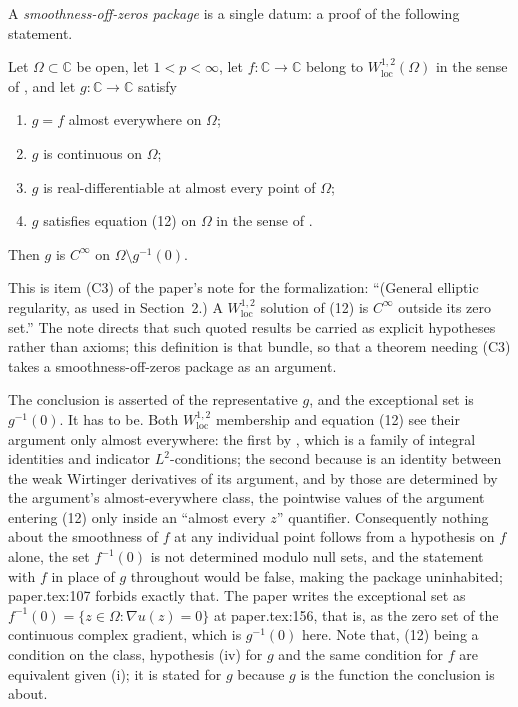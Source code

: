 \begin{definition}
A \emph{smoothness-off-zeros package} is a single datum: a proof of the
following statement.

Let $\Omega\subset\mathbb{C}$ be open, let $1<p<\infty$, let
$f\colon\mathbb{C}\to\mathbb{C}$ belong to $W^{1,2}_{\mathrm{loc}}(\Omega)$ in
the sense of , and let $g\colon\mathbb{C}\to\mathbb{C}$
satisfy
\begin{enumerate}
\item[(i)] $g=f$ almost everywhere on $\Omega$;
\item[(ii)] $g$ is continuous on $\Omega$;
\item[(iii)] $g$ is real-differentiable at almost every point of $\Omega$;
\item[(iv)] $g$ satisfies equation (12) on $\Omega$ in the sense of
  .
\end{enumerate}
Then $g$ is $C^\infty$ on $\Omega\setminus g^{-1}(0)$.

This is item (C3) of the paper's note for the formalization: ``(General
elliptic regularity, as used in Section~2.)  A $W^{1,2}_{\mathrm{loc}}$
solution of (12) is $C^\infty$ outside its zero set.''  The note directs that
such quoted results be carried as explicit hypotheses rather than axioms; this
definition is that bundle, so that a theorem needing (C3) takes a
smoothness-off-zeros package as an argument.

The conclusion is asserted of the representative $g$, and the exceptional set
is $g^{-1}(0)$.  It has to be.  Both $W^{1,2}_{\mathrm{loc}}$ membership and
equation (12) see their argument only almost everywhere: the first by
, which is a family of integral identities and indicator
$L^2$-conditions; the second because  is an identity
between the weak Wirtinger derivatives of its argument, and by
 those are determined by the argument's
almost-everywhere class, the pointwise values of the argument entering (12)
only inside an ``almost every $z$'' quantifier.  Consequently nothing about
the smoothness of $f$ at any individual point follows from a hypothesis on $f$
alone, the set $f^{-1}(0)$ is not determined modulo null sets, and the
statement with $f$ in place of $g$ throughout would be false, making the
package uninhabited; paper.tex:107 forbids exactly that.  The paper writes the
exceptional set as $f^{-1}(0)=\{z\in\Omega:\nabla u(z)=0\}$ at paper.tex:156,
that is, as the zero set of the continuous complex gradient, which is
$g^{-1}(0)$ here.  Note that, (12) being a condition on the class, hypothesis
(iv) for $g$ and the same condition for $f$ are equivalent given (i); it is
stated for $g$ because $g$ is the function the conclusion is about.


\end{definition}
